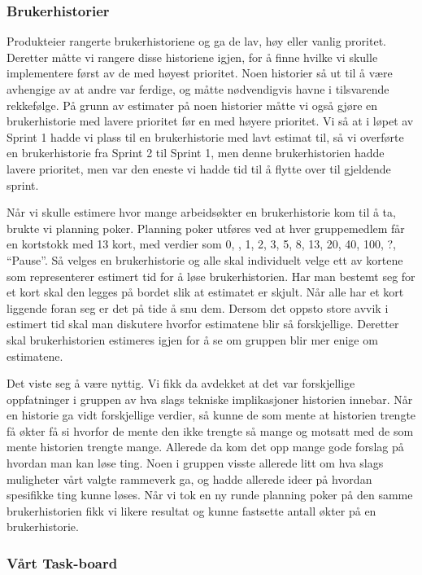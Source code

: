 \documentclass[12pt,a4paper,norsk]{article}
\begin{document}
	\subsubsection{Brukerhistorier}
	Produkteier rangerte brukerhistoriene og ga de lav, høy eller vanlig proritet. Deretter måtte vi rangere disse historiene igjen, for å finne hvilke vi skulle implementere først av de med høyest prioritet. Noen historier så ut til å være avhengige av at andre var ferdige, og måtte nødvendigvis havne i tilsvarende rekkefølge. På grunn av estimater på noen historier måtte vi også gjøre en brukerhistorie med lavere prioritet før en med høyere prioritet. Vi så at i løpet av Sprint 1 hadde vi plass til en brukerhistorie med lavt estimat til, så vi overførte en brukerhistorie fra Sprint 2 til Sprint 1, men denne brukerhistorien hadde lavere prioritet, men var den eneste vi hadde tid til å flytte over til gjeldende sprint. 

    Når vi skulle estimere hvor mange arbeidsøkter en brukerhistorie kom til å ta, brukte vi planning poker. Planning poker utføres ved at hver gruppemedlem får en kortstokk med 13 kort, med verdier som 0, \textonehalf, 1, 2, 3, 5, 8, 13, 20, 40, 100, ?, “Pause”. Så velges en brukerhistorie og alle skal individuelt velge ett av kortene som representerer estimert tid for å løse brukerhistorien. Har man bestemt seg for et kort skal den legges på bordet slik at estimatet er skjult. Når alle har et kort liggende foran seg er det på tide å snu dem. Dersom det oppsto store avvik i estimert tid skal man diskutere hvorfor estimatene blir så forskjellige. Deretter skal brukerhistorien estimeres igjen for å se om gruppen blir mer enige om estimatene.

    Det viste seg å være nyttig. Vi fikk da avdekket at det var forskjellige oppfatninger i gruppen av hva slags tekniske implikasjoner historien innebar. Når en historie ga vidt forskjellige verdier, så kunne de som mente at historien trengte få økter få si hvorfor de mente den ikke trengte så mange og motsatt med de som mente historien trengte mange. Allerede da kom det opp mange gode forslag på hvordan man kan løse ting. Noen i gruppen visste allerede litt om hva slags muligheter vårt valgte rammeverk ga, og hadde allerede ideer på hvordan spesifikke ting kunne løses. Når vi tok en ny runde planning poker på den samme brukerhistorien fikk vi likere resultat og kunne fastsette antall økter på en brukerhistorie. 

	
	
	
	\subsubsection{Vårt Task-board}
\end{document}
